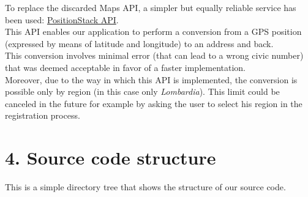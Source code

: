 To replace the discarded Maps API, a simpler but equally reliable service has been used: \href{https://positionstack.com/documentation}{PositionStack API}.\\
This API enables our application to perform a conversion from a GPS position (expressed by means of latitude and longitude) to an address and back.\\
This conversion involves minimal error (that can lead to a wrong civic number) that was deemed acceptable in favor of a faster implementation.\\
Moreover, due to the way in which this API is implemented, the conversion is possible only by region (in this case only \emph{Lombardia}). This limit could be canceled in the future for example by asking the user to select his region in the registration process.

\chapter{4. Source code structure}

This is a simple directory tree that shows the structure of our source code.


